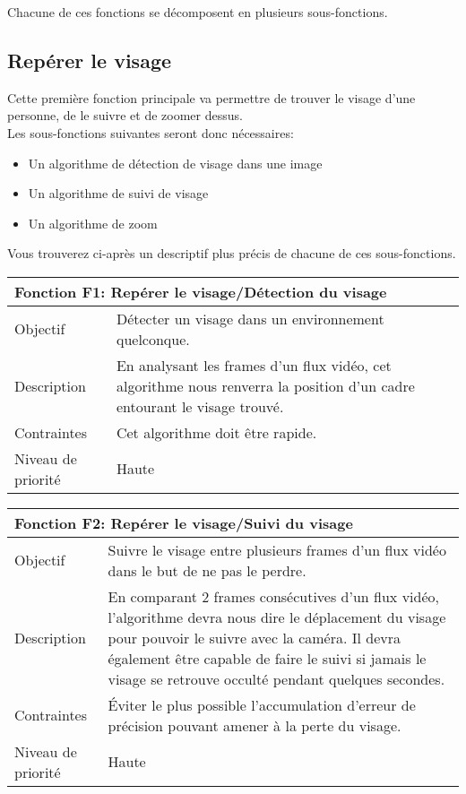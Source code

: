 \documentclass[poster]{polytech/polytech}
\begin{document}
Chacune de ces fonctions se décomposent en plusieurs sous-fonctions.

\subsection{Repérer le visage}
Cette première fonction principale va permettre de trouver le visage d'une personne, de le suivre et de zoomer dessus.\\
Les sous-fonctions suivantes seront donc nécessaires:
\begin{itemize}
\item Un algorithme de détection de visage dans une image
\item Un algorithme de suivi de visage
\item Un algorithme de zoom\\
\end{itemize}

Vous trouverez ci-après un descriptif plus précis de chacune de ces sous-fonctions.

\begin{tabular}{|l|p{12.5cm}|}
   \hline
   \multicolumn{2}{|l|}{\textbf{Fonction F1: Repérer le visage/Détection du visage}} \\
   \hline
   Objectif &Détecter un visage dans un environnement quelconque.\\
   \hline
   Description &En analysant les frames d'un flux vidéo, cet algorithme nous renverra la position d'un cadre entourant le visage trouvé.\\
   \hline
   Contraintes &Cet algorithme doit être rapide. \\
   \hline
   Niveau de priorité &Haute \\
   \hline
\end{tabular}

\begin{tabular}{|l|p{12.5cm}|}
   \hline
   \multicolumn{2}{|l|}{\textbf{Fonction F2: Repérer le visage/Suivi du visage}} \\
   \hline
   Objectif &Suivre le visage entre plusieurs frames d'un flux vidéo dans le but de ne pas le perdre. \\
   \hline
   Description &En comparant 2 frames consécutives d'un flux vidéo, l'algorithme devra nous dire le déplacement du visage pour pouvoir le suivre avec la caméra. Il devra également être capable de faire le suivi si jamais le visage se retrouve occulté pendant quelques secondes. \\
   \hline
   Contraintes &Éviter le plus possible l'accumulation d'erreur de précision pouvant amener à la perte du visage. \\
   \hline
   Niveau de priorité &Haute \\
   \hline
\end{tabular}
\end{document}
